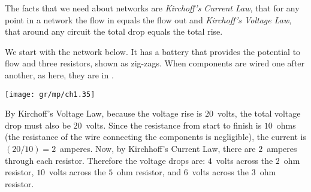 The facts that we need about networks are  
\textit{Kirchoff's Current Law}, that for any point in a network the flow in
     equals the flow out and
\textit{Kirchoff's Voltage Law}, that around any circuit the total drop equals 
     the total rise.

We start with the network below.
It has a battery that provides the potential to flow 
and three resistors, shown as zig-zags.
When components are wired one after another, as here,
they are in .
\begin{center}
  \texttt{[image: gr/mp/ch1.35]}
\end{center}
By Kirchoff's Voltage Law, because the voltage rise is
$20$~volts, the total voltage drop must also be $20$~volts.
Since the resistance from start to finish is
$10$~ohms (the resistance of the wire connecting the components is negligible),
the current is $(20/10)=2$~amperes. 
Now, by Kirchhoff's Current Law, there are $2$~amperes through
each resistor.
Therefore the voltage drops are: 
$4$~volts across the $2$~ohm resistor,
$10$~volts across the $5$~ohm resistor, 
and $6$~volts across the $3$~ohm resistor.

